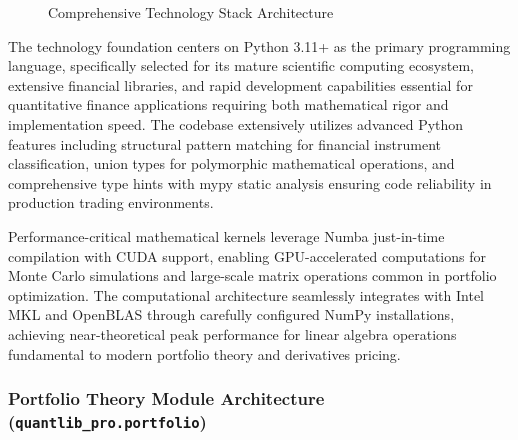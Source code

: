 \documentclass[12pt,a4paper]{article}
\theoremstyle{definition}
\theoremstyle{remark}
\begin{document}
\begin{figure}[htbp]
\centering
{}
{
}
\caption{Comprehensive Technology Stack Architecture \citep{kubernetes2023, docker2023, prometheus2023}}
\label{fig:technology_stack}
\end{figure}

The technology foundation centers on Python 3.11+ as the primary programming language, specifically selected for its mature scientific computing ecosystem, extensive financial libraries, and rapid development capabilities essential for quantitative finance applications requiring both mathematical rigor and implementation speed. The codebase extensively utilizes advanced Python features including structural pattern matching for financial instrument classification, union types for polymorphic mathematical operations, and comprehensive type hints with mypy static analysis ensuring code reliability in production trading environments.

Performance-critical mathematical kernels leverage Numba just-in-time compilation with CUDA support, enabling GPU-accelerated computations for Monte Carlo simulations and large-scale matrix operations common in portfolio optimization. The computational architecture seamlessly integrates with Intel MKL and OpenBLAS through carefully configured NumPy installations, achieving near-theoretical peak performance for linear algebra operations fundamental to modern portfolio theory and derivatives pricing.

\subsubsection{Portfolio Theory Module Architecture (\texttt{quantlib\_pro.portfolio})}
\end{document}
